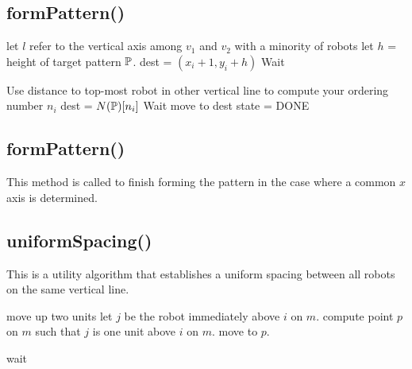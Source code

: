 \documentclass[preprint,10pt]{elsarticle}
\begin{document}
\subsection{formPattern()} 
	\begin{algorithm}[H]
	\begin{algorithmic}[1]

		\State let $l$ refer to the vertical axis among $v_1$ and $v_2$ with a minority of robots
			\State let $h$ = height of target pattern $\mathbb{P}$.
			\State dest = $(x_i + 1, y_i + h)$
		\EndIf
			Wait
		\EndWhile

		\State Use distance to top-most robot in other vertical line to compute your 
		ordering number $n_i$
		\State dest = $N(\mathbb{P})[n_i]$
			Wait
		\EndWhile
		\State move to dest
		state = DONE

	\EndProcedure
	\end{algorithmic}
	\end{algorithm}
\subsection{formPattern()} 
	This method is called to finish forming the pattern in the case where
	a common $x$ axis is determined.
\begin{algorithm}[H]
\begin{algorithmic}[1]
			
		\EndCase
	\EndSwitch
\EndProcedure
\end{algorithmic}
\end{algorithm}

\subsection{uniformSpacing()} 
	This is a utility algorithm that establishes a uniform spacing between all robots on
	the same vertical line.
\begin{algorithm}[H]
\begin{algorithmic}[1]
		\State move up two units
	\EndIf
	\State let $j$ be the robot immediately above $i$ on $m$.
	\State compute point $p$ on $m$ such that $j$ is one
	unit above $i$ on $m$.
	\State move to $p$.

		\State wait
	\EndWhile
\EndProcedure
\end{algorithmic}
\end{algorithm}
\end{document}
